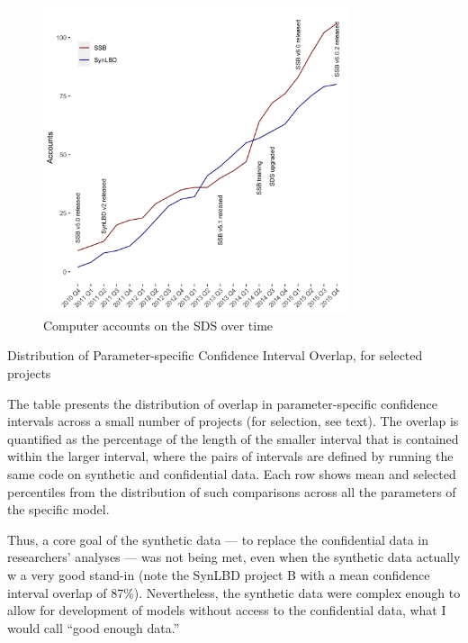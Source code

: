 \documentclass[inline]{hdsr}
\begin{document}
\begin{figure}
    \centering
    \includegraphics[width=0.8\textwidth]{accounts-2015.png}
    \caption{Computer accounts on the SDS over time}
    \label{fig:growth_in_sds}
\end{figure}

\begin{table}[]
    \centering
    \begin{threeparttable}
        
        \caption{Distribution of Parameter-specific Confidence Interval Overlap, for selected projects}
        \label{tab:overlap}
        \begin{tablenotes}
            \footnotesize
            \item[] The table presents the distribution of overlap in parameter-specific confidence intervals \citep{tas2006} across a small number of projects (for selection, see text). The overlap is quantified as the percentage of the length of the smaller interval that is contained within the larger interval, where the pairs of intervals are defined by running the same code on synthetic and confidential data. Each row shows mean and selected percentiles from the distribution of such comparisons across all the parameters of the specific model. 
        \end{tablenotes}
    \end{threeparttable}
\end{table}
Thus, a core goal of the synthetic data --- to replace the confidential data in researchers' analyses --- was not being met, even when the synthetic data actually w a very good stand-in (note the SynLBD project B with a mean confidence interval overlap of 87\%). Nevertheless, the synthetic data were complex enough to allow for development of models without access to the confidential data, what I would call ``good enough data.''
\end{document}
